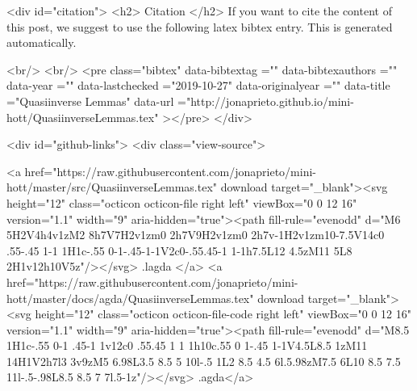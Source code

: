   
  <div id="citation">
  <h2> Citation </h2>
  If you want to cite the content of this post,
  we suggest to use the following latex bibtex entry.
  This is generated automatically.

  <br/>
  <br/>
  <pre class="bibtex"
       data-bibtextag =""
       data-bibtexauthors =""
       data-year =""
       data-lastchecked ="2019-10-27"
       data-originalyear =""
       data-title ="Quasiinverse Lemmas"
       data-url ="http://jonaprieto.github.io/mini-hott/QuasiinverseLemmas.tex"
  ></pre>
  </div>
  

  <div id="github-links">
    <div class="view-source">
      
        <a href="https://raw.githubusercontent.com/jonaprieto/mini-hott/master/src/QuasiinverseLemmas.tex" download target="_blank"><svg height="12" class="octicon octicon-file right left" viewBox="0 0 12 16" version="1.1" width="9" aria-hidden="true"><path fill-rule="evenodd" d="M6 5H2V4h4v1zM2 8h7V7H2v1zm0 2h7V9H2v1zm0 2h7v-1H2v1zm10-7.5V14c0 .55-.45 1-1 1H1c-.55 0-1-.45-1-1V2c0-.55.45-1 1-1h7.5L12 4.5zM11 5L8 2H1v12h10V5z"/></svg> .lagda </a>
        <a href="https://raw.githubusercontent.com/jonaprieto/mini-hott/master/docs/agda/QuasiinverseLemmas.tex" download target="_blank"><svg height="12" class="octicon octicon-file-code right left" viewBox="0 0 12 16" version="1.1" width="9" aria-hidden="true"><path fill-rule="evenodd" d="M8.5 1H1c-.55 0-1 .45-1 1v12c0 .55.45 1 1 1h10c.55 0 1-.45 1-1V4.5L8.5 1zM11 14H1V2h7l3 3v9zM5 6.98L3.5 8.5 5 10l-.5 1L2 8.5 4.5 6l.5.98zM7.5 6L10 8.5 7.5 11l-.5-.98L8.5 8.5 7 7l.5-1z"/></svg> .agda</a>
      
